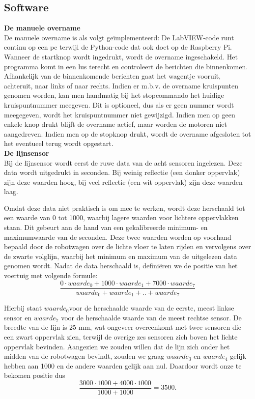 \documentclass[a4paper,kulak]{kulakarticle}
\begin{document}
\subsection{Software}

\textbf{\large De manuele overname} \\
De manuele overname is als volgt geïmplementeerd: De LabVIEW-code runt continu op een pc terwijl de Python-code dat ook doet op de Raspberry Pi. Wanneer de startknop wordt ingedrukt, wordt de overname ingeschakeld. Het programma komt in een lus terecht en controleert de berichten die binnenkomen. Afhankelijk van de binnenkomende berichten gaat het wagentje vooruit, achteruit, naar links of naar rechts. Indien er m.b.v. de overname kruispunten genomen worden, kan men handmatig bij het stopcommando het huidige kruispuntnummer meegeven. Dit is optioneel, dus als er geen nummer wordt meegegeven, wordt het kruispuntnummer niet gewijzigd. Indien men op geen enkele knop drukt blijft de overname actief, maar worden de motoren niet aangedreven. Indien men op de stopknop drukt, wordt de overname afgesloten tot het eventueel terug wordt opgestart. \\

\textbf{\large De lijnsensor} \\
Bij de lijnsensor wordt eerst de ruwe data van de acht sensoren ingelezen. Deze data wordt uitgedrukt in seconden. Bij weinig reflectie (een donker oppervlak) zijn deze waarden hoog, bij veel reflectie (een wit oppervlak) zijn deze waarden laag. 

Omdat deze data niet praktisch is om mee te werken, wordt deze herschaald tot een waarde van 0 tot 1000, waarbij lagere waarden voor lichtere oppervlakken staan. Dit gebeurt aan de hand van een gekalibreerde minimum- en maximumwaarde van de seconden. Deze twee waarden worden op voorhand bepaald door de robotwagen over de lichte vloer te laten rijden en vervolgens over de zwarte volglijn, waarbij het minimum en maximum van de uitgelezen data genomen wordt. 
Nadat de data herschaald is, definiëren we de positie van het voertuig met volgende formule:
\begin{equation*}
	\frac{0\cdot waarde_{0} + 1000\cdot waarde_{1}+ 7000\cdot waarde_{7}} {waarde_{0} + waarde_{1} + .. + waarde_{7}}
\end{equation*}

Hierbij staat $waarde_{0} $voor de herschaalde waarde van de eerste, meest linkse sensor en $waarde_{7}$ voor de herschaalde waarde van de meest rechtse sensor. De breedte van de lijn is 25 mm, wat ongeveer overeenkomt met twee sensoren die een zwart oppervlak zien, terwijl de overige zes sensoren zich boven het lichte oppervlak bevinden. Aangezien we zouden willen dat de lijn zich onder het midden van de robotwagen bevindt, zouden we graag $waarde_{3}$ en $waarde_{4}$ gelijk hebben aan 1000 en de andere waarden gelijk aan nul. Daardoor wordt onze te bekomen positie dus\begin{equation*} \frac{3000\cdot1000+4000\cdot1000}{1000+1000} = 3500.\end{equation*}
\end{document}
